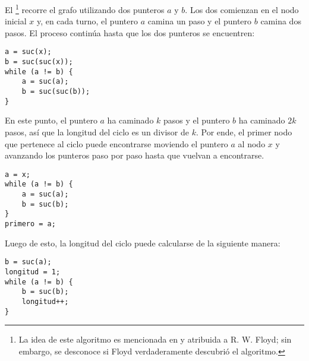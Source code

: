 
El \footnote{La idea de este algoritmo es
    mencionada en \cite{knu982} y atribuida a R. W. Floyd; sin embargo,
    se desconoce si Floyd verdaderamente descubrió el algoritmo.}
recorre el grafo utilizando dos punteros $a$ y $b$. Los dos comienzan
en el nodo inicial $x$ y, en cada turno, el puntero $a$ camina un paso
y el puntero $b$ camina dos pasos. El proceso continúa hasta que los
dos punteros se encuentren:

\begin{lstlisting}
a = suc(x);
b = suc(suc(x));
while (a != b) {
    a = suc(a);
    b = suc(suc(b));
}
\end{lstlisting}

En este punto, el puntero $a$ ha caminado $k$ pasos y el puntero $b$
ha caminado $2k$ pasos, así que la longitud del ciclo es un divisor de $k$.
Por ende, el primer nodo que pertenece al ciclo puede encontrarse
moviendo el puntero $a$ al nodo $x$ y avanzando los punteros paso por
paso hasta que vuelvan a encontrarse.
\begin{lstlisting}
a = x;
while (a != b) {
    a = suc(a);
    b = suc(b);
}
primero = a;
\end{lstlisting}

Luego de esto, la longitud del ciclo puede calcularse de
la siguiente manera:
\begin{lstlisting}
b = suc(a);
longitud = 1;
while (a != b) {
    b = suc(b);
    longitud++;
}
\end{lstlisting}
